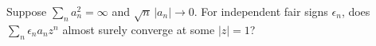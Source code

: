 Suppose $\sum_n a_n^2=\infty$ and $\sqrt n\,|a_n|\to0$. For independent fair signs $\epsilon_n$, does $\sum_n\epsilon_na_nz^n$ almost surely converge at some $|z|=1$?

